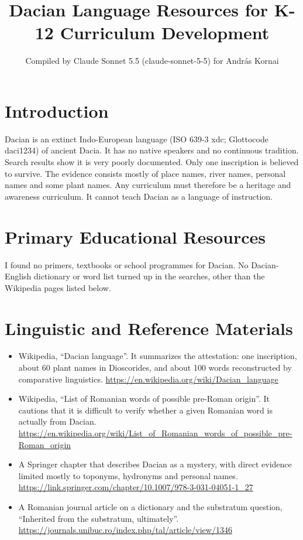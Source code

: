 \documentclass[12pt]{article}
\title{Dacian Language Resources for K-12 Curriculum Development}
\author{Compiled by Claude Sonnet 5.5 (claude-sonnet-5-5) for Andr\'as Kornai}
\date{}
\begin{document}
\maketitle

\section{Introduction}
Dacian is an extinct Indo-European language (ISO 639-3 xdc; Glottocode daci1234) of ancient Dacia. It has no native speakers and no continuous tradition. Search results show it is very poorly documented. Only one inscription is believed to survive. The evidence consists mostly of place names, river names, personal names and some plant names. Any curriculum must therefore be a heritage and awareness curriculum. It cannot teach Dacian as a language of instruction.

\section{Primary Educational Resources}
I found no primers, textbooks or school programmes for Dacian. No Dacian-English dictionary or word list turned up in the searches, other than the Wikipedia pages listed below.

\section{Linguistic and Reference Materials}
\begin{itemize}
\item Wikipedia, ``Dacian language''. It summarizes the attestation: one inscription, about 60 plant names in Dioscorides, and about 100 words reconstructed by comparative linguistics. \url{https://en.wikipedia.org/wiki/Dacian_language}
\item Wikipedia, ``List of Romanian words of possible pre-Roman origin''. It cautions that it is difficult to verify whether a given Romanian word is actually from Dacian. \url{https://en.wikipedia.org/wiki/List_of_Romanian_words_of_possible_pre-Roman_origin}
\item A Springer chapter that describes Dacian as a mystery, with direct evidence limited mostly to toponyms, hydronyms and personal names. \url{https://link.springer.com/chapter/10.1007/978-3-031-04051-1_27}
\item A Romanian journal article on a dictionary and the substratum question, ``Inherited from the substratum, ultimately''. \url{https://journals.unibuc.ro/index.php/tal/article/view/1346}
\end{itemize}
\end{document}
